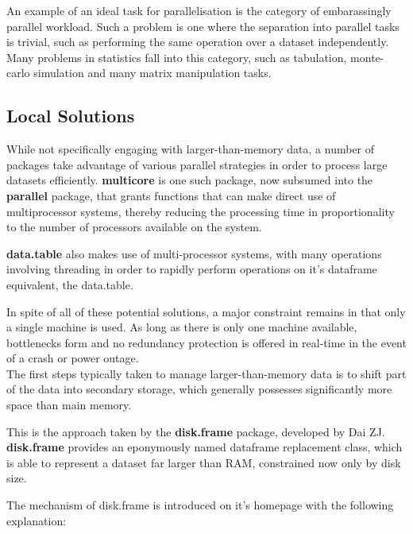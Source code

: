 \documentclass[a4paper,10pt]{article}
\begin{document}
An example of an ideal task for parallelisation is the category of embarassingly parallel workload.
Such a problem is one where the separation into parallel tasks is trivial, such as performing the same operation over a dataset independently\cite{foster1995parallel}.
Many problems in statistics fall into this category, such as tabulation, monte-carlo simulation and many matrix manipulation tasks.

\subsection{Local Solutions}
\label{local}

While not specifically engaging with larger-than-memory data, a number of packages take advantage of various parallel strategies in order to process large datasets efficiently.
\textbf{multicore} is one such package, now subsumed into the \textbf{parallel} package, that grants functions that can make direct use of multiprocessor systems, thereby reducing the processing time in proportionality to the number of processors available on the system.

\textbf{data.table} also makes use of multi-processor systems, with many operations involving threading in order to rapidly perform operations on it's dataframe equivalent, the data.table.

In spite of all of these potential solutions, a major constraint remains in that only a single machine is used.
As long as there is only one machine available, bottlenecks form and no redundancy protection is offered in real-time in the event of a crash or power outage.\\

The first steps typically taken to manage larger-than-memory data is to shift part of the data into secondary storage, which generally possesses significantly more space than main memory.

This is the approach taken by the \textbf{disk.frame} package, developed by Dai ZJ.
\textbf{disk.frame} provides an eponymously named dataframe replacement class, which is able to represent a dataset far larger than RAM, constrained now only by disk size\cite{zj20}.

The mechanism of disk.frame is introduced on it's homepage with the
following explanation:
\end{document}
